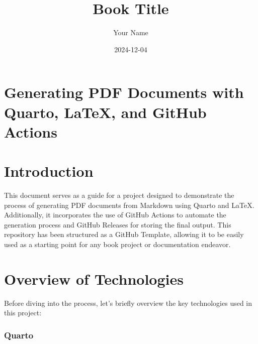 \documentclass[
  letterpaper,
  paper=6in:9in,
  pagesize=pdftex,
  headinclude=on,
  footinclude=on,
  12pt]{scrbook}
\title{Book Title}
\author{Your Name}
\date{2024-12-04}
\renewcommand*\contentsname{Inhaltsverzeichnis}
\newcommand\contentsname{Inhaltsverzeichnis}
\begin{document}
\frontmatter
\maketitle


\renewcommand*\contentsname{Inhaltsverzeichnis}
{
\setcounter{tocdepth}{2}
\tableofcontents
}

\mainmatter
{}

\chapter*{Generating PDF Documents with Quarto, LaTeX, and GitHub
Actions}\label{generating-pdf-documents-with-quarto-latex-and-github-actions}



\chapter{Introduction}\label{introduction}

This document serves as a guide for a project designed to demonstrate
the process of generating PDF documents from Markdown using Quarto and
LaTeX. Additionally, it incorporates the use of GitHub Actions to
automate the generation process and GitHub Releases for storing the
final output. This repository has been structured as a GitHub Template,
allowing it to be easily used as a starting point for any book project
or documentation endeavor.


\chapter{Overview of Technologies}\label{overview-of-technologies}

Before diving into the process, let's briefly overview the key
technologies used in this project:

\subsection{Quarto}\label{quarto}
\end{document}
